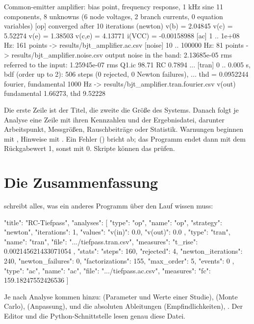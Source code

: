 \begin{shell}
Common-emitter amplifier: bias point, frequency response, 1 kHz sine
11 components, 8 unknowns (6 node voltages, 2 branch currents, 0 equation variables)
[op] converged after 10 iterations (newton)
  v(b)   = 2.04845
  v(c)   = 5.52274
  v(e)   = 1.38503
  v(c,e) = 4.13771
  i(VCC) = -0.00158988
[ac] 1 .. 1e+08 Hz: 161 points -> results/bjt_amplifier.ac.csv
[noise] 10 .. 100000 Hz: 81 points -> results/bjt_amplifier.noise.csv
  output noise in the band: 2.13685e-05 rms
  referred to the input:    1.25945e-07 rms
    Q1.ic        98.71 %
    RC           0.7894 %
    ...
[tran] 0 .. 0.005 s, bdf (order up to 2): 506 steps (0 rejected, 0 Newton failures), ...
  thd = 0.0952244
  fourier, fundamental 1000 Hz -> results/bjt_amplifier.tran.fourier.csv
    v(out)  fundamental 1.66273, thd 9.52228 %
\end{shell}

Die erste Zeile ist der Titel, die zweite die Größe des Systems. Danach
folgt je Analyse eine Zeile mit ihren Kennzahlen und der Ergebnisdatei,
darunter Arbeitspunkt, Messgrößen, Rauschbeiträge oder Statistik.
Warnungen beginnen mit , Hinweise mit . Ein Fehler
() bricht ab; das Programm endet dann mit dem Rückgabewert
1, sonst mit 0. Skripte können das prüfen.

\section{Die Zusammenfassung}
\label{sec:summary}

 schreibt alles, was ein anderes Programm über
den Lauf wissen muss:

\begin{json}
{
  "title": "RC-Tiefpass",
  "analyses": [
    { "type": "op", "name": "op", "strategy": "newton", "iterations": 1,
      "values": { "v(in)": 0.0, "v(out)": 0.0 } },
    { "type": "tran", "name": "tran", "file": ".../tiefpass.tran.csv",
      "measures": { "t_rise": 0.002145621433071054 },
      "stats": { "steps": 160, "rejected": 4, "newton_iterations": 240,
                 "newton_failures": 0, "factorizations": 155,
                 "max_order": 5, "events": 0 } },
    { "type": "ac", "name": "ac", "file": ".../tiefpass.ac.csv",
      "measures": { "fc": 159.18247552426536 } }
  ]
}
\end{json}

Je nach Analyse kommen hinzu:  (Parameter und Werte einer
Studie),  (Monte Carlo),  (Anpassung),
 und die absoluten Ableitungen (Empfindlichkeiten),
. Der Editor und die Python-Schnittstelle lesen genau diese
Datei.

